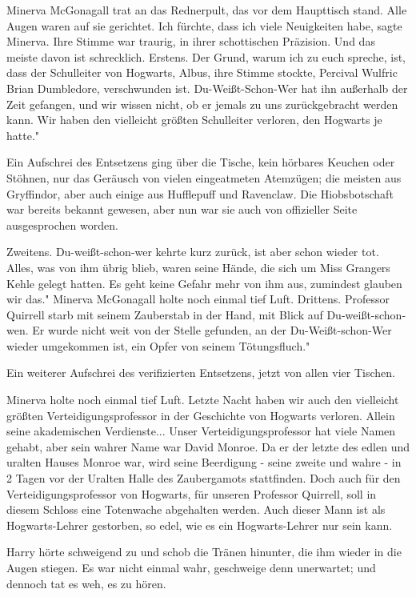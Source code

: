 Minerva McGonagall trat an das Rednerpult, das vor dem Haupttisch stand. Alle
Augen waren auf sie gerichtet. \glqq Ich fürchte, dass ich viele Neuigkeiten
habe\grqq{}, sagte Minerva. Ihre Stimme war traurig, in ihrer schottischen
Präzision. \glqq Und das meiste davon ist schrecklich. Erstens. Der Grund, warum
ich zu euch spreche, ist, dass der Schulleiter von Hogwarts, Albus\grqq{}, ihre
Stimme stockte, \glqq Percival Wulfric Brian Dumbledore, verschwunden ist.
Du-Weißt-Schon-Wer hat ihn außerhalb der Zeit gefangen, und wir wissen nicht, ob
er jemals zu uns zurückgebracht werden kann. Wir haben den vielleicht größten
Schulleiter verloren, den Hogwarts je hatte."

Ein Aufschrei des Entsetzens ging über die Tische, kein hörbares Keuchen oder
Stöhnen, nur das Geräusch von vielen eingeatmeten Atemzügen; die meisten aus
Gryffindor, aber auch einige aus Hufflepuff und Ravenclaw. Die Hiobsbotschaft
war bereits bekannt gewesen, aber nun war sie auch von offizieller Seite
ausgesprochen worden.

\glqq Zweitens. Du-weißt-schon-wer kehrte kurz zurück, ist aber schon wieder
tot. Alles, was von ihm übrig blieb, waren seine Hände, die sich um Miss
Grangers Kehle gelegt hatten. Es geht keine Gefahr mehr von ihm aus, zumindest
glauben wir das." Minerva McGonagall holte noch einmal tief Luft. \glqq
Drittens. Professor Quirrell starb mit seinem Zauberstab in der Hand, mit Blick
auf Du-weißt-schon-wen. Er wurde nicht weit von der Stelle gefunden, an der
Du-Weißt-schon-Wer wieder umgekommen ist, ein Opfer von seinem Tötungsfluch."

Ein weiterer Aufschrei des verifizierten Entsetzens, jetzt von allen vier
Tischen.

Minerva holte noch einmal tief Luft. \glqq Letzte Nacht haben wir auch den
vielleicht größten Verteidigungsprofessor in der Geschichte von Hogwarts
verloren. Allein seine akademischen Verdienste... Unser Verteidigungsprofessor
hat viele Namen gehabt, aber sein wahrer Name war David Monroe. Da er der letzte
des edlen und uralten Hauses Monroe war, wird seine Beerdigung - seine zweite
und wahre - in 2 Tagen vor der Uralten Halle des Zaubergamots stattfinden. Doch
auch für den Verteidigungsprofessor von Hogwarts, für unseren Professor
Quirrell, soll in diesem Schloss eine Totenwache abgehalten werden. Auch dieser
Mann ist als Hogwarts-Lehrer gestorben, so edel, wie es ein Hogwarts-Lehrer nur
sein kann.\grqq{}

Harry hörte schweigend zu und schob die Tränen hinunter, die ihm wieder in die
Augen stiegen. Es war nicht einmal wahr, geschweige denn unerwartet; und dennoch
tat es weh, es zu hören.

